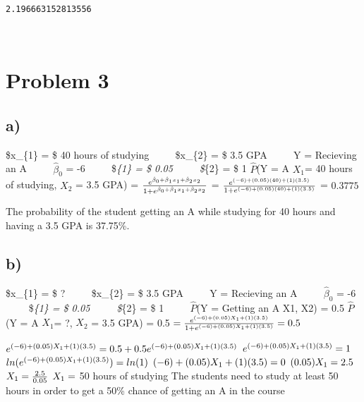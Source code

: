 \documentclass[11pt]{article}
\begin{document}
    \begin{Verbatim}[commandchars=\\\{\}]
2.196663152813556
    \end{Verbatim}

    \begin{center}
    \end{center}
    { \hspace*{\fill} \\}
    
    \hypertarget{problem-3}{%
\section{Problem 3}\label{problem-3}}

    \hypertarget{a}{%
\subsection{a)}\label{a}}

    \$x\_\{1\} = \$ 40 hours of studying    \$x\_\{2\} = \$ 3.5 GPA    Y =
Recieving an A    \(\hat\beta_{0}\) = -6    \$\hat\beta\emph{\{1\} = \$
0.05    \$\hat\beta}\{2\} = \$ 1 \(\hat P\)(Y = A \textbar{} \(X_{1}\)=
40 hours of studying, \(X_{2}\) = 3.5 GPA) =
\(\Large\frac{e^{\hat\beta_{0} + \hat\beta_{1}x_{1} + \hat\beta_{2}x_{2}}}{1 + e^{\hat\beta_{0} + \hat\beta_{1}x_{1} + \hat\beta_{2}x_{2}}}\)
=
\(\Large\frac{e^{(-6) + (0.05)(40) + (1)(3.5)}}{1 + e^{(-6) + (0.05)(40) + (1)(3.5)}}\)
= \(0.3775\)

The probability of the student getting an A while studying for 40 hours
and having a 3.5 GPA is 37.75\%.

    \hypertarget{b}{%
\subsection{b)}\label{b}}

    \$x\_\{1\} = \$ ?    \$x\_\{2\} = \$ 3.5 GPA    Y = Recieving an A   
\(\hat\beta_{0}\) = -6    \$\hat\beta\emph{\{1\} = \$ 0.05   
\$\hat\beta}\{2\} = \$ 1    \(\hat P\)(Y = Getting an A\textbar{} X1,
X2) = 0.5 \(\hat P\)(Y = A \textbar{} \(X_{1}\)= ?, \(X_{2}\) = 3.5 GPA)
= 0.5
\(\normalsize = \frac{e^{(-6) + (0.05)X_{1} + (1)(3.5)}}{1 + e^{(-6) + (0.05)X_{1} + (1)(3.5)}} = 0.5\)

\(\normalsize e^{(-6) + (0.05)X_{1} + (1)(3.5)} = 0.5 + 0.5e^{(-6) + (0.05)X_{1} + (1)(3.5)}\)
\(\normalsize e^{(-6) + (0.05)X_{1} + (1)(3.5)} = 1\)
\(\small ln(e^{(-6) + (0.05)X_{1} + (1)(3.5)}) = ln(1)\)
\(\small (-6) + (0.05)X_{1} + (1)(3.5) = 0\)
\(\small (0.05)X_{1} = 2.5\) \(\normalsize X_{1} = \frac{2.5}{0.05}\)
\(\normalsize X_{1} =\) 50 hours of studying The students need to study
at least 50 hours in order to get a 50\% chance of getting an A in the
course
\end{document}
